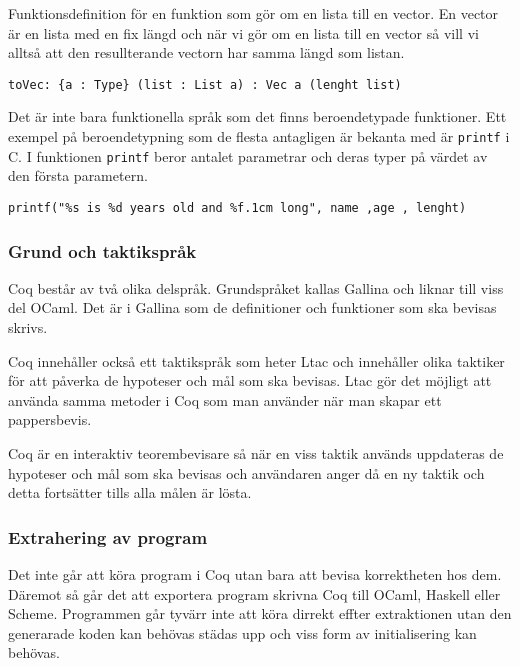 Funktionsdefinition för en funktion som gör om en lista till en vector. En
vector är en lista med en fix längd och när vi gör om en lista till en vector
så vill vi alltså att den resullterande vectorn har samma längd som listan.
\begin{verbatim}
toVec: {a : Type} (list : List a) : Vec a (lenght list)
\end{verbatim}
Det är inte bara funktionella språk som det finns beroendetypade funktioner.
Ett exempel på beroendetypning som de flesta antagligen är bekanta med är
\texttt{printf} i C. I funktionen \texttt{printf} beror antalet parametrar och
deras typer på värdet av den första parametern.

\begin{verbatim}
printf("%s is %d years old and %f.1cm long", name ,age , lenght)
\end{verbatim}

\begin{comment}
CoqArt
http://mattam.org/research/publications/Programming_with_Dependent_Types_in_Coq-PPS-260209.pdf
** DONE Grund och taktikspråk
   CLOSED: [2013-05-10 fre 10:41]
\end{comment}

\subsubsection{Grund och taktikspråk}
Coq består av två olika delspråk. Grundspråket kallas Gallina och liknar till
viss del OCaml. Det är i Gallina som de definitioner och funktioner som ska
bevisas skrivs.

Coq innehåller också ett taktikspråk som heter Ltac och innehåller olika
taktiker för att påverka de hypoteser och mål som ska bevisas. Ltac gör det
möjligt att använda samma metoder i Coq som man använder när man skapar ett
pappersbevis.

Coq är en interaktiv teorembevisare så när en viss taktik används uppdateras de
hypoteser och mål som ska bevisas och användaren anger då en ny taktik och
detta fortsätter tills alla målen är lösta.

\subsubsection{Extrahering av program}
Det inte går att köra program i Coq utan bara att bevisa korrektheten hos dem.
Däremot så går det att exportera program skrivna Coq till OCaml, Haskell eller
Scheme. Programmen går tyvärr inte att köra dirrekt effter extraktionen utan
den generarade koden kan behövas städas upp och viss form av initialisering kan
behövas.


